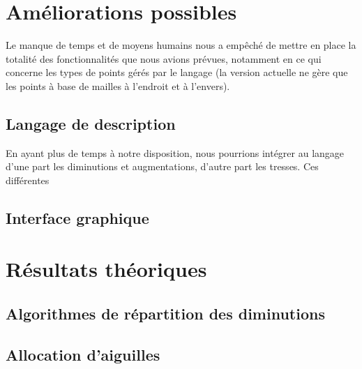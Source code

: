 \documentclass{article}
\begin{document}




\section{Améliorations possibles}

Le manque de temps et de moyens humains nous a empêché de mettre en place la totalité des fonctionnalités que nous avions prévues, notamment en ce qui concerne les 
types de points gérés par le langage (la version actuelle ne gère que les points à base de mailles à l'endroit et à l'envers).

\subsection{Langage de description}
En ayant plus de temps à notre disposition, nous pourrions intégrer au langage d'une part les diminutions et augmentations, d'autre part les tresses. Ces 
différentes 

\subsection{Interface graphique}




\section{Résultats théoriques}

\subsection{Algorithmes de répartition des diminutions}

\subsection{Allocation d'aiguilles}
\end{document}
